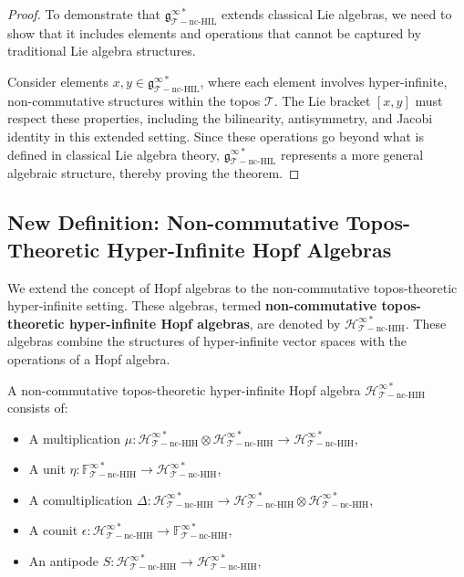 \documentclass{article}
\begin{document}
\begin{proof}
To demonstrate that \(\mathfrak{g}_{\mathcal{T}-\text{nc-HIL}}^{\infty *}\) extends classical Lie algebras, we need to show that it includes elements and operations that cannot be captured by traditional Lie algebra structures.

Consider elements \(x, y \in \mathfrak{g}_{\mathcal{T}-\text{nc-HIL}}^{\infty *}\), where each element involves hyper-infinite, non-commutative structures within the topos \(\mathcal{T}\). The Lie bracket \([x, y]\) must respect these properties, including the bilinearity, antisymmetry, and Jacobi identity in this extended setting. Since these operations go beyond what is defined in classical Lie algebra theory, \(\mathfrak{g}_{\mathcal{T}-\text{nc-HIL}}^{\infty *}\) represents a more general algebraic structure, thereby proving the theorem.
\end{proof}

\subsection{New Definition: Non-commutative Topos-Theoretic Hyper-Infinite Hopf Algebras}
We extend the concept of Hopf algebras to the non-commutative topos-theoretic hyper-infinite setting. These algebras, termed \textbf{non-commutative topos-theoretic hyper-infinite Hopf algebras}, are denoted by \(\mathcal{H}_{\mathcal{T}-\text{nc-HIH}}^{\infty *}\). These algebras combine the structures of hyper-infinite vector spaces with the operations of a Hopf algebra.

A non-commutative topos-theoretic hyper-infinite Hopf algebra \(\mathcal{H}_{\mathcal{T}-\text{nc-HIH}}^{\infty *}\) consists of:

\begin{itemize}
    \item A multiplication \(\mu: \mathcal{H}_{\mathcal{T}-\text{nc-HIH}}^{\infty *} \otimes \mathcal{H}_{\mathcal{T}-\text{nc-HIH}}^{\infty *} \to \mathcal{H}_{\mathcal{T}-\text{nc-HIH}}^{\infty *}\),
    \item A unit \(\eta: \mathbb{F}_{\mathcal{T}-\text{nc-HIH}}^{\infty *} \to \mathcal{H}_{\mathcal{T}-\text{nc-HIH}}^{\infty *}\),
    \item A comultiplication \(\Delta: \mathcal{H}_{\mathcal{T}-\text{nc-HIH}}^{\infty *} \to \mathcal{H}_{\mathcal{T}-\text{nc-HIH}}^{\infty *} \otimes \mathcal{H}_{\mathcal{T}-\text{nc-HIH}}^{\infty *}\),
    \item A counit \(\epsilon: \mathcal{H}_{\mathcal{T}-\text{nc-HIH}}^{\infty *} \to \mathbb{F}_{\mathcal{T}-\text{nc-HIH}}^{\infty *}\),
    \item An antipode \(S: \mathcal{H}_{\mathcal{T}-\text{nc-HIH}}^{\infty *} \to \mathcal{H}_{\mathcal{T}-\text{nc-HIH}}^{\infty *}\),
\end{itemize}
\end{document}
